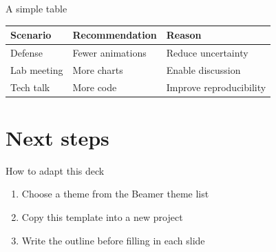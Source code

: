 \documentclass[aspectratio=169,11pt]{beamer}
\begin{document}
\begin{frame}{A simple table}
  \begin{table}
    \centering
    \begin{tabular}{lll}
      \toprule
      Scenario & Recommendation & Reason \\
      \midrule
      Defense & Fewer animations & Reduce uncertainty \\
      Lab meeting & More charts & Enable discussion \\
      Tech talk & More code & Improve reproducibility \\
      \bottomrule
    \end{tabular}
  \end{table}
\end{frame}

\section{Next steps}

\begin{frame}{How to adapt this deck}
  \begin{enumerate}
    \item Choose a theme from the Beamer theme list
    \item Copy this template into a new project
    \item Write the outline before filling in each slide
  \end{enumerate}
\end{frame}
\end{document}
